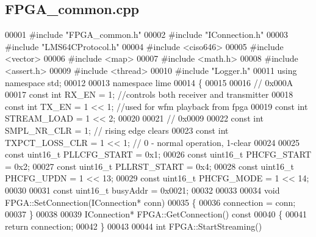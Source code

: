 \subsection{F\+P\+G\+A\+\_\+common.\+cpp}
\label{FPGA__common_8cpp_source}

\begin{DoxyCode}
00001 \textcolor{preprocessor}{#include "FPGA_common.h"}
00002 \textcolor{preprocessor}{#include "IConnection.h"}
00003 \textcolor{preprocessor}{#include "LMS64CProtocol.h"}
00004 \textcolor{preprocessor}{#include <ciso646>}
00005 \textcolor{preprocessor}{#include <vector>}
00006 \textcolor{preprocessor}{#include <map>}
00007 \textcolor{preprocessor}{#include <math.h>}
00008 \textcolor{preprocessor}{#include <assert.h>}
00009 \textcolor{preprocessor}{#include <thread>}
00010 \textcolor{preprocessor}{#include "Logger.h"}
00011 \textcolor{keyword}{using namespace }std;
00012 
00013 \textcolor{keyword}{namespace }lime
00014 \{
00015 
00016 \textcolor{comment}{// 0x000A}
00017 \textcolor{keyword}{const} \textcolor{keywordtype}{int} RX_EN = 1; \textcolor{comment}{//controls both receiver and transmitter}
00018 \textcolor{keyword}{const} \textcolor{keywordtype}{int} TX_EN = 1 << 1; \textcolor{comment}{//used for wfm playback from fpga}
00019 \textcolor{keyword}{const} \textcolor{keywordtype}{int} STREAM_LOAD = 1 << 2;
00020 
00021 \textcolor{comment}{// 0x0009}
00022 \textcolor{keyword}{const} \textcolor{keywordtype}{int} SMPL_NR_CLR = 1; \textcolor{comment}{// rising edge clears}
00023 \textcolor{keyword}{const} \textcolor{keywordtype}{int} TXPCT_LOSS_CLR = 1 << 1; \textcolor{comment}{// 0 - normal operation, 1-clear}
00024 
00025 \textcolor{keyword}{const} uint16\_t PLLCFG_START = 0x1;
00026 \textcolor{keyword}{const} uint16\_t PHCFG_START = 0x2;
00027 \textcolor{keyword}{const} uint16\_t PLLRST_START = 0x4;
00028 \textcolor{keyword}{const} uint16\_t PHCFG_UPDN = 1 << 13;
00029 \textcolor{keyword}{const} uint16\_t PHCFG_MODE = 1 << 14;
00030 
00031 \textcolor{keyword}{const} uint16\_t busyAddr = 0x0021;
00032 
00033 
00034 \textcolor{keywordtype}{void} FPGA::SetConnection(IConnection* conn)
00035 \{
00036     connection = conn;
00037 \}
00038 
00039 IConnection* FPGA::GetConnection()\textcolor{keyword}{ const}
00040 \textcolor{keyword}{}\{
00041     \textcolor{keywordflow}{return} connection;
00042 \}
00043 
00044 \textcolor{keywordtype}{int} FPGA::StartStreaming()

\end{DoxyCode}
